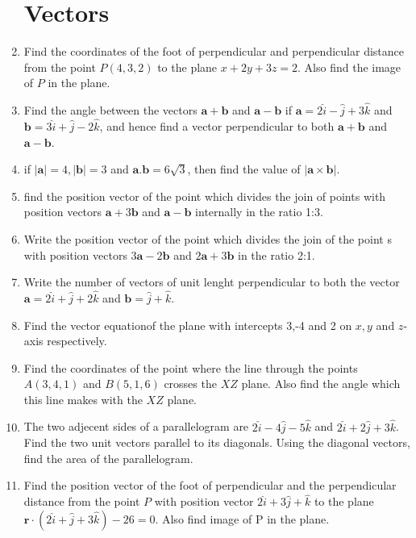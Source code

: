 \documentclass[12pt,-letter paper]{article}
\let\vec\mathbf{}
\let\vec\mathbf{}
\let\vec\mathbf{}
\theoremstyle{remark}
\providecommand{\brak}[1]{\ensuremath{\left(#1\right)}}
\providecommand{\abs}[1]{\left\vert#1\right\vert}
\begin{document}
\begin{enumerate}
            \section{Vectors}
      \item Find the coordinates of the foot of perpendicular and perpendicular distance from the point $P\brak{4, 3, 2}$ to the plane $x+2y+3z=2$. Also find the image of $P$ in the plane.
      \item Find the angle between the vectors $\vec{a} + \vec{b}$ and $\vec{a}-\vec{b}$ if $\vec{a}=2\hat{i}-\hat{j}+3\hat{k}$ and $\vec{b}= 3\hat{i} + \hat{j} -2\hat{k}$, and hence find a vector perpendicular to both $\vec{a}+\vec{b}$ and $\vec{a}-\vec{b}$.
      \item if $\abs{\vec{a}} = 4 , \abs{\vec{b}}=3$  and $\vec{a}.\vec{b}=6\sqrt{3}$, then find the value of $\abs{\vec{a}\times \vec{b}}$.
      \item find the position vector of the point which divides the join of points with position vectors $\vec{a}+3\vec{b}$ and $\vec{a}-\vec{b}$ internally in the ratio 1:3.
      \item Write the position vector of the point which divides the join of the point s with position vectors $3\vec{a} - 2\vec{b}$ and $2\vec{a} + 3\vec{b}$ in the ratio 2:1.
      \item Write the number of vectors of unit lenght perpendicular to both the vector $\vec{a} = 2 \hat{i} + \hat{j} +2\hat{k}$ and $\vec{b}= \hat{j}+\hat{k}$.
      \item Find the vector equationof the plane with intercepts 3,-4 and 2 on $x,y$ and  $z$-axis respectively.
      \item Find the coordinates of the point where the line through the points $A\brak{3,4,1}$ and $B\brak{5,1,6}$ crosses the $XZ$ plane. Also find the angle which this line makes with the $XZ$ plane.
      \item The two adjecent sides of a parallelogram are $2\hat{i}-4\hat{j}-5\hat{k}$ and $2\hat{i}+2\hat{j}+3\hat{k}$. Find the two unit vectors parallel to its diagonals. Using the diagonal vectors, find the area of the parallelogram.
      \item Find the position vector of the foot of perpendicular and the perpendicular distance from the point $P$ with position vector $2\hat{i}+3\hat{j}+\hat{k}$ to the plane $\vec{r}\cdot\brak{2\hat{i}+\hat{j}+3\hat{k}} - 26=0$. Also find image of P in the plane.

\end{enumerate}
\end{document}
